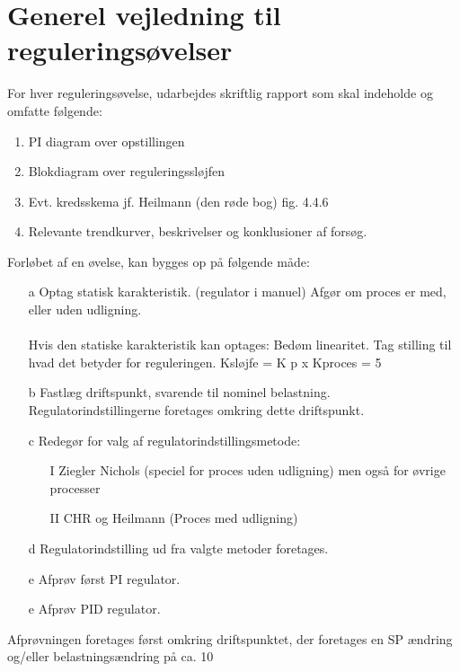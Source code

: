 \documentclass[12pt,a4paper]{article}
\begin{document}
	\section{Generel vejledning til reguleringsøvelser}
	For hver reguleringsøvelse, udarbejdes skriftlig rapport som skal indeholde og omfatte følgende:
	\begin{enumerate}
		\item PI diagram over opstillingen
		\item Blokdiagram over reguleringssløjfen
		\item Evt. kredsskema jf. Heilmann (den røde bog) fig. 4.4.6
		\item Relevante trendkurver, beskrivelser og konklusioner af forsøg.
	\end{enumerate}
	Forløbet af en øvelse, kan bygges op på følgende måde:
	\begin{itemize}
		\item [a] Optag statisk karakteristik. (regulator i manuel) Afgør om proces er med, eller uden udligning.
		\\\\
		Hvis den statiske karakteristik kan optages:
		Bedøm linearitet. Tag stilling til hvad det betyder for reguleringen. Ksløjfe = K p x Kproces = 5
		
		\item[b] Fastlæg driftspunkt, svarende til nominel belastning.
		Regulatorindstillingerne foretages omkring dette driftspunkt.
		
		\item[c] Redegør for valg af regulatorindstillingsmetode:
		\begin{itemize}
			\item[I] Ziegler Nichols (speciel for proces uden udligning) men også for øvrige processer
			\item[II] CHR og Heilmann (Proces med udligning)
		\end{itemize}

		\item[d] Regulatorindstilling ud fra valgte metoder foretages.
		
		\item[e] Afprøv først PI regulator.
		
		\item[e] Afprøv PID regulator.
	
	\end{itemize}
	Afprøvningen foretages først omkring driftspunktet, der foretages en SP ændring og/eller   belastningsændring på ca. 10 %
	
\end{document}
